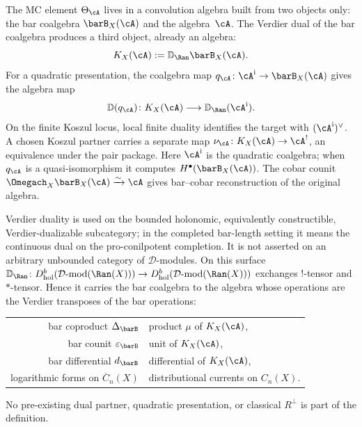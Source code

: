 The MC element $\Theta_\cA$ lives in a convolution algebra built
from two objects only: the bar coalgebra $\barB_X(\cA)$ and the
algebra~$\cA$. The Verdier dual of the bar coalgebra produces a
third object, already an algebra:
\begin{equation}\label{eq:homotopy-koszul-dual-def}
K_X(\cA):=\mathbb{D}_{\Ran}\barB_X(\cA).
\end{equation}
For a quadratic presentation, the coalgebra map
$q_\cA\colon\cA^{\mathrm i}\to\barB_X(\cA)$ gives the algebra map
\[
\mathbb D(q_\cA)\colon K_X(\cA)\longrightarrow
\mathbb D_{\Ran}(\cA^{\mathrm i}).
\]
On the finite Koszul locus, local finite duality identifies the target
with $(\cA^{\mathrm i})^\vee$.  A chosen Koszul partner carries a
separate map $\nu_\cA\colon K_X(\cA)\to\cA^!$, an equivalence under
the pair package.  Here $\cA^{\mathrm i}$ is the quadratic coalgebra;
when $q_\cA$ is a quasi-isomorphism it computes
$H^\bullet(\barB_X(\cA))$.
The cobar counit
$\Omegach_X\barB_X(\cA)\xrightarrow{\sim}\cA$ gives bar--cobar
reconstruction of the original algebra.

Verdier duality is used on the bounded holonomic, equivalently
constructible, Verdier-dualizable subcategory; in the completed
bar-length setting it means the continuous dual on the
pro-conilpotent completion. It is not asserted on an arbitrary
unbounded category of $\mathcal{D}$-modules. On this surface
$\mathbb{D}_{\Ran} \colon
D^b_{\mathrm{hol}}(\mathcal{D}\text{-mod}(\Ran(X)))
\to D^b_{\mathrm{hol}}(\mathcal{D}\text{-mod}(\Ran(X)))$
exchanges $!$-tensor and $*$-tensor. Hence it carries the bar
coalgebra to the algebra whose operations are the Verdier transposes
of the bar operations:
\begin{center}
\begin{tabular}{r@{\;$\longleftrightarrow$\;}l}
bar coproduct $\Delta_{\barB}$ & product $\mu$ of $K_X(\cA)$, \\
bar counit $\varepsilon_{\barB}$ & unit of $K_X(\cA)$, \\
bar differential $d_{\barB}$ & differential of $K_X(\cA)$, \\
logarithmic forms on $\overline{C}_n(X)$ & distributional
 currents on $C_n(X)$.
\end{tabular}
\end{center}
No pre-existing dual partner, quadratic presentation, or
classical $R^\perp$ is part of the definition.

